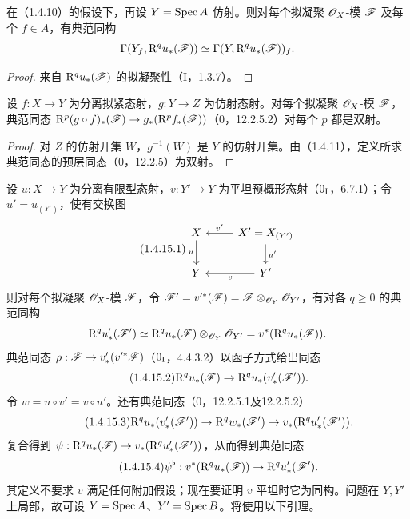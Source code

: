 在（1.4.10）的假设下，再设 $Y=\operatorname{Spec} A$ 仿射。则对每个拟凝聚 $\mathscr O_X$-模 $\mathscr F$ 及每个 $f\in A$，有典范同构
\[
\Gamma(Y_f,\mathrm R^qu_*(\mathscr F))\simeq\Gamma(Y,\mathrm R^qu_*(\mathscr F))_f.
\]
\begin{proof}来自 $\mathrm R^qu_*(\mathscr F)$ 的拟凝聚性（I，1.3.7）。\end{proof}

设 $f:X\to Y$ 为分离拟紧态射，$g:Y\to Z$ 为仿射态射。对每个拟凝聚 $\mathscr O_X$-模 $\mathscr F$，典范同态 $\mathrm R^p(g\circ f)_*(\mathscr F)\to g_*(\mathrm R^pf_*(\mathscr F))$（0，12.2.5.2）对每个 $p$ 都是双射。
\begin{proof}
对 $Z$ 的仿射开集 $W$，$g^{-1}(W)$ 是 $Y$ 的仿射开集。由（1.4.11），定义所求典范同态的预层同态（0，12.2.5）为双射。
\end{proof}

设 $u:X\to Y$ 为分离有限型态射，$v:Y'\to Y$ 为平坦预概形态射（$0_{\mathrm I}$，6.7.1）；令 $u'=u_{(Y')}$，使有交换图
\begin{equation}\tag{1.4.15.1}
\begin{tikzcd}
X&X'=X_{(Y')}\arrow[l,"v'"']\arrow[d,"u'"]\\
Y\arrow[u,leftarrow,"u"]&Y'\arrow[l,"v"]
\end{tikzcd}
\end{equation}
则对每个拟凝聚 $\mathscr O_X$-模 $\mathscr F$，令 $\mathscr F'=v'^*(\mathscr F)=\mathscr F\otimes_{\mathscr O_Y}\mathscr O_{Y'}$，有对各 $q\geq0$ 的典范同构
\[
\mathrm R^qu'_*(\mathscr F')\simeq\mathrm R^qu_*(\mathscr F)\otimes_{\mathscr O_Y}\mathscr O_{Y'}=v^*(\mathrm R^qu_*(\mathscr F)).
\]
\eproof 典范同态 $\rho:\mathscr F\to v'_*(v'^*\mathscr F)$（$0_{\mathrm I}$，4.4.3.2）以函子方式给出同态
\begin{equation}\tag{1.4.15.2}
\mathrm R^qu_*(\mathscr F)\to\mathrm R^qu_*(v'_*(\mathscr F')).
\end{equation}
令 $w=u\circ v'=v\circ u'$。还有典范同态（0，12.2.5.1及12.2.5.2）
\begin{equation}\tag{1.4.15.3}
\mathrm R^qu_*(v'_*(\mathscr F'))\to\mathrm R^qw_*(\mathscr F')\to v_*(\mathrm R^qu'_*(\mathscr F')).
\end{equation}
复合得到 $\psi:\mathrm R^qu_*(\mathscr F)\to v_*(\mathrm R^qu'_*(\mathscr F'))$，从而得到典范同态
\begin{equation}\tag{1.4.15.4}
\psi^\flat:v^*(\mathrm R^qu_*(\mathscr F))\to\mathrm R^qu'_*(\mathscr F').
\end{equation}
其定义不要求 $v$ 满足任何附加假设；现在要证明 $v$ 平坦时它为同构。问题在 $Y,Y'$ 上局部，故可设 $Y=\operatorname{Spec} A$、$Y'=\operatorname{Spec} B$。将使用以下引理。

